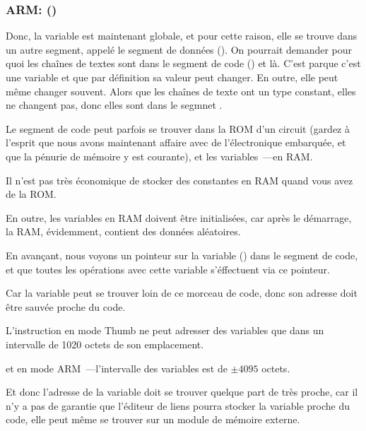 \subsubsection{ARM: \OptimizingKeilVI (\ThumbMode)}



Donc, la variable  est maintenant globale, et pour cette raison, elle se trouve
dans un autre segment, appelé le segment de données ().
On pourrait demander pour quoi les chaînes de textes sont dans le segment de code
() et  là.
C'est parque c'est une variable et que par définition sa valeur peut changer. En
outre, elle peut même changer souvent.
Alors que les chaînes de texte ont un type constant, elles ne changent pas, donc
elles sont dans le segmnet .
\myindex{\RAM}
\myindex{\ROM}

Le segment de code peut parfois se trouver dans la \ac{ROM} d'un circuit (gardez
à l'esprit que nous avons maintenant affaire avec de l'électronique embarquée, et
que la pénurie de mémoire y est courante), et les variables~---en \ac{RAM}.

Il n'est pas très économique de stocker des constantes en RAM quand vous avez de
la ROM.

En outre, les variables en RAM doivent être initialisées, car après le démarrage,
la RAM, évidemment, contient des données aléatoires.


En avançant, nous voyons un pointeur sur la variable  () dans
le segment de code, et que toutes les opérations avec cette variable s'éffectuent
via ce pointeur.

Car la variable  peut se trouver loin de ce morceau de code, donc son adresse
doit être sauvée proche du code.

L'instruction  en mode Thumb ne peut adresser des variables que dans un
intervalle de 1020 octets de son emplacement.

et en mode ARM~---l'intervalle des variables est de $\pm{}4095$ octets.

Et donc l'adresse de la variable  doit se trouver quelque part de très proche,
car il n'y a pas de garantie que l'éditeur de liens pourra stocker la variable proche
du code, elle peut même se trouver sur un module de mémoire externe.

\myindex{\ROM}

